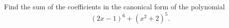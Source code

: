 Find the sum of the coefficients in the canonical form of the polynomial \[(2x-1)^{6}+(x^{2}+2)^{5}.\]
